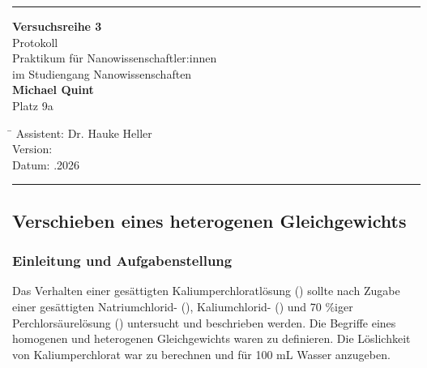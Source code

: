 \documentclass[
	a4paper,										%
	12pt,											%
	twoside,										%
	headsepline,								%
	footsepline,									%
	captions=tableheading,					%
]{scrartcl}
\begin{document}
	
	\begin{titlepage}
		\begin{center}
			\hrule													%
			\vspace*{5cm}
			\Huge {\textbf {Versuchsreihe 3}}\\						%
			\vspace*{0.5cm}
			\vspace*{1cm}
			\normalsize
			Protokoll	\\									
			Praktikum für Nanowissenschaftler:innen\\
			im Studiengang Nanowissenschaften\\
			\vspace*{0.5cm}
			\Large {\textbf{Michael Quint}}		\\						%
			\vspace*{0.5cm}
					\normalsize{Platz 9a}								%
			\vfill
		\end{center}
		\begin{tabbing}
			\hspace{3cm}\=\kill
			Assistent: \> Dr. Hauke Heller \\						%
			Version:  \\									%
			Datum: .2026 \\								%
		\end{tabbing}
		\hrule														%
\end{titlepage}

\setcounter{page}{1}
\setcounter{section}{3}								%
\setcounter{subsection}{0}							%
\setcounter{secnumdepth}{4}
	
\subsection{Verschieben eines heterogenen Gleichgewichts}

\subsubsection{Einleitung und Aufgabenstellung}

	Das Verhalten einer gesättigten Kaliumperchloratlösung () sollte nach Zugabe einer gesättigten Natriumchlorid- (),
	Kaliumchlorid- () und 70 \%iger Perchlorsäurelösung () untersucht und beschrieben werden. Die Begriffe eines homogenen und heterogenen Gleichgewichts waren zu definieren.
	Die Löslichkeit von Kaliumperchlorat war zu berechnen und für 100 mL Wasser anzugeben.
\end{document}
